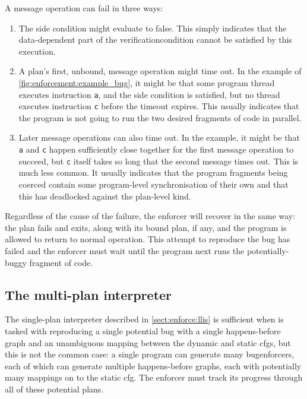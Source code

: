 A message operation can fail  in three ways:
\begin{enumerate}
\item
  The \gls{side condition} might evaluate to false.  This simply indicates
  that the data-dependent part of the \gls{verificationcondition}
  cannot be satisfied by this execution.

\item
  A plan's first, unbound, message operation might time out.  In the
  example of \autoref{fig:enforcement:example_bug}, it might be that
  some program thread executes instruction \texttt{a}, and the
  \gls{side condition} is satisfied, but no thread executes
  instruction \texttt{c} before the timeout expires.  This usually
  indicates that the program is not going to run the two desired
  fragments of code in parallel.

\item
  Later message operations can also time out.  In the example, it
  might be that \texttt{a} and \texttt{c} happen sufficiently close
  together for the first message operation to succeed, but \texttt{c}
  itself takes so long that the second message times out.  This is
  much less common.  It usually indicates that the program fragments
  being coerced contain some program-level synchronisation of their
  own and that this has deadlocked against the plan-level kind.
\end{enumerate}
Regardless of the cause of the failure, the enforcer will recover in
the same way: the plan fails and exits, along with its bound plan, if
any, and the program is allowed to return to normal operation.  This
attempt to reproduce the bug has failed and the enforcer must wait
until the program next runs the potentially-buggy fragment of code.

\subsection{The multi-plan interpreter}
\label{sect:enforce:succ}

The single-plan interpreter described in \autoref{sect:enforce:llis}
is sufficient when {\technique} is tasked with reproducing a single
potential bug with a single happens-before graph and an unambiguous
mapping between the dynamic and static \glspl{cfg}, but this is not
the common case: a single program can generate many
\glspl{bugenforcer}, each of which can generate multiple
happens-before graphs, each with potentially many mappings on to the
\gls{static cfg}.  The enforcer must track its progress through all of
these potential plans.

